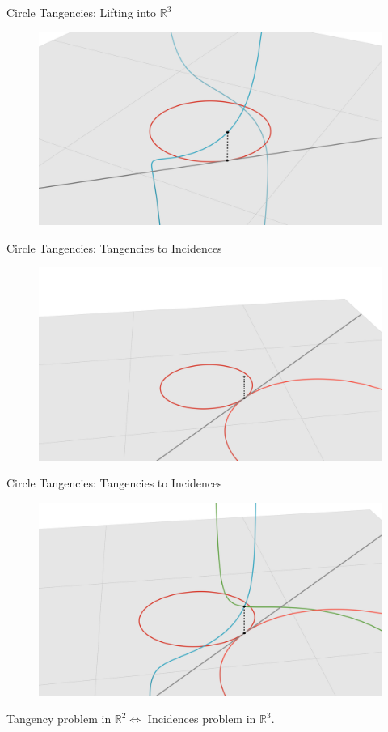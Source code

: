 \documentclass{beamer}
\newcommand{\RR}{\mathbb R}
\newcommand{\nfr}[1]{\begin{frame} #1
\end{frame}}
\begin{document}
\nfr{{Circle Tangencies: Lifting into $\RR^3$}

\begin{figure}[h]
    \centering
    \includegraphics[width=0.8
    \textwidth, trim={5cm 0 4cm 2cm}, clip=true]{images/Diagram3d.png}
\end{figure}

}




\nfr{{Circle Tangencies: Tangencies to Incidences}

\begin{figure}[h]
    \centering
    \includegraphics[width=0.8
    \textwidth, trim={5cm 0 4cm 2cm}, clip=true]{images/Diagram4a.png}
\end{figure}


}

\nfr{{Circle Tangencies: Tangencies to Incidences}

\begin{figure}[h]
    \centering
    \includegraphics[width=0.8
    \textwidth, trim={5cm 0 4cm 2cm}, clip=true]{images/Diagram4b.png}
\end{figure}

Tangency problem in $\RR^2 \iff $ Incidences problem in $\RR^3$.
}
\end{document}
